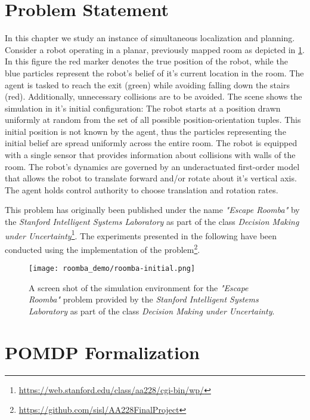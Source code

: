 \section{Problem Statement}\label{sec:lp-problem-statement}

In this chapter we study an instance of simultaneous localization and planning.
Consider a robot operating in a planar, previously mapped room as depicted in
\cref{fig:roomba-env}. In this figure the red marker denotes the true position
of the robot, while the blue particles represent the robot's belief of it's
current location in the room. The agent is tasked to reach the exit (green)
while avoiding falling down the stairs (red). Additionally, unnecessary
collisions are to be avoided. The scene shows the simulation in it's initial
configuration: The robot starts at a position drawn uniformly at random from
the set of all possible position-orientation tuples. This initial position is
not known by the agent, thus the particles representing the initial belief are
spread uniformly across the entire room. The robot is equipped with a single
sensor that provides information about collisions with walls of the room. The
robot's dynamics are governed by an underactuated first-order model that allows
the robot to translate forward and/or rotate about it's vertical axis. The
agent holds control authority to choose translation and rotation rates.

This problem has originally been published under the name \emph{"Escape
Roomba"} by the \emph{Stanford Intelligent Systems Laboratory} as part of the
class \emph{Decision Making under
Uncertainty}\footnote{\url{https://web.stanford.edu/class/aa228/cgi-bin/wp/}}.
The experiments presented in the following have been conducted using the
\pomdpsjl implementation of the
problem\footnote{\url{https://github.com/sisl/AA228FinalProject}}.

\begin{figure}[htpb]
  \centering
  \texttt{[image: roomba\_demo/roomba-initial.png]}
  \caption{A screen shot of the simulation environment for the \emph{"Escape
  Roomba"} problem provided by the \emph{Stanford Intelligent Systems
  Laboratory} as part of the class \emph{Decision Making under Uncertainty}.}
  \label{fig:roomba-env}
\end{figure}

\clearpage
\section{POMDP Formalization}\label{sec:lp-pomdp-formalization}


